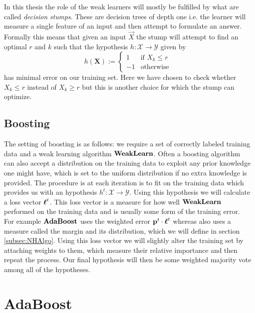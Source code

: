 \par In this thesis the role of the weak learners will mostly be fulfilled by what are called \textit{decision stumps}. These are decision trees of depth one i.e. the learner will measure a single feature of an input and then attempt to formulate an answer. Formally this means that given an input $\vec X$ the stump will attempt to find an optimal $r$ and $k$ such that  the hypothesis $h:\mathcal X \to \mathcal Y$ given by $$h(\mathbf X):= \begin{cases}1 &\text{if } X_k \leq r\\-1&\text{otherwise}\end{cases}$$ has minimal error on our training set. Here we have chosen to check whether $X_k\leq r$ instead of  $X_k\geq r$ but this is another choice for which the stump can optimize. 

\subsection{Boosting}
\label{subsec:boosting}
The setting of boosting is as follows: we require a set of correctly labeled training data and a weak learning algorithm $\textbf{WeakLearn}$. Often a boosting algorithm can also accept a distribution on the training data to exploit any prior knowledge one might have, which is set to the uniform distribution if no extra knowledge is provided. The procedure is at each iteration is to fit \weak on the training data which provides us with an hypothesis $h^t:\mathcal X \to \mathcal Y$. Using this hypothesis we will calculate a loss vector $\boldsymbol\ell^t$. This loss vector is a measure for how well $\textbf{WeakLearn}$ performed on the training data and is usually some form of the training error. For example $\textbf{AdaBoost}$ uses the weighted error $\mathbf{p}^t\cdot\boldsymbol\ell^t$ whereas \NHB also uses a measure called the margin and its distribution, which we will define in section \ref{subsec:NHAlgo}. Using this loss vector we will slightly alter the training set by attaching weights to them, which measure their relative importance and then repeat the process. Our final hypothesis will then be some weighted majority vote among all of the hypotheses. 

\newpage
\section{AdaBoost}
\label{sec:ada}

